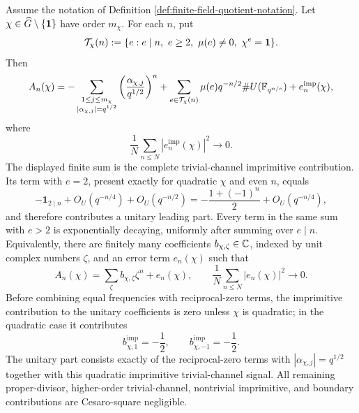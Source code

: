 \begin{proposition}\label{prop:finite-field-unitary-artin-expansion}
Assume the notation of Definition \ref{def:finite-field-quotient-notation}. Let \(\chi\in\widehat G\setminus\{\mathbf{1}\}\) have order \(m_\chi\). For each \(n\), put
\[
\mathcal T_\chi(n):=
\{e:e\mid n,\ e\ge2,\ \mu(e)\ne0,\ \chi^e=\mathbf{1}\}.
\]
Then
\[
A_n(\chi)
=
-\sum_{\substack{1\le j\le m_\chi\\ |\alpha_{\chi,j}|=q^{1/2}}}
\left(\frac{\alpha_{\chi,j}}{q^{1/2}}\right)^n
+\sum_{e\in\mathcal T_\chi(n)}
\mu(e)q^{-n/2}\#U(\mathbb{F}_{q^{n/e}})
+e_n^{\mathrm{imp}}(\chi),
\]
where
\[
\frac1N\sum_{n\le N}|e_n^{\mathrm{imp}}(\chi)|^2\longrightarrow0.
\]
The displayed finite sum is the complete trivial-channel imprimitive contribution. Its term with \(e=2\), present exactly for quadratic \(\chi\) and even \(n\), equals
\[
-\mathbf 1_{2\mid n}+O_U(q^{-n/4})+O_U(q^{-n/2})
= -\frac{1+(-1)^n}{2}+O_U(q^{-n/4}),
\]
and therefore contributes a unitary leading part. Every term in the same sum with \(e>2\) is exponentially decaying, uniformly after summing over \(e\mid n\). Equivalently, there are finitely many coefficients \(b_{\chi,\zeta}\in\mathbb{C}\), indexed by unit complex numbers \(\zeta\), and an error term \(e_n(\chi)\) such that
\[
A_n(\chi)=\sum_{\zeta}b_{\chi,\zeta}\zeta^n+e_n(\chi),
\qquad
\frac1N\sum_{n\le N}|e_n(\chi)|^2\longrightarrow0.
\]
Before combining equal frequencies with reciprocal-zero terms, the imprimitive contribution to the unitary coefficients is zero unless \(\chi\) is quadratic; in the quadratic case it contributes
\[
b_{\chi,1}^{\mathrm{imp}}=-\frac12,
\qquad
b_{\chi,-1}^{\mathrm{imp}}=-\frac12.
\]
The unitary part consists exactly of the reciprocal-zero terms with \(|\alpha_{\chi,j}|=q^{1/2}\) together with this quadratic imprimitive trivial-channel signal. All remaining proper-divisor, higher-order trivial-channel, nontrivial imprimitive, and boundary contributions are Cesaro-square negligible.
\end{proposition}

